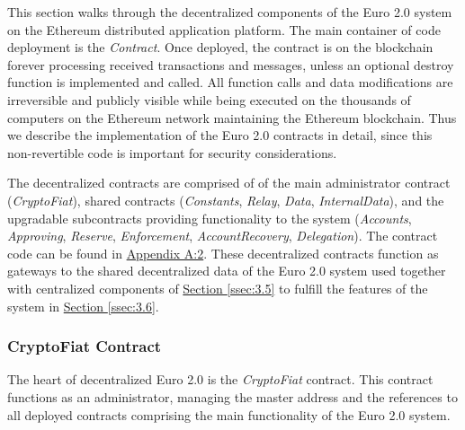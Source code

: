 \documentclass[a4paper,12pt]{article} %
\newcommand{\hypersectionref}[1]{\hyperref[#1]{Section \ref{#1}}}
\begin{document}
{{This section walks through the decentralized components of the Euro 2.0 system on the Ethereum distributed application platform. The main container of code deployment is the \textit{Contract}. Once deployed, the contract is on the blockchain forever processing received transactions and messages, unless an optional destroy function is implemented and called. All function calls and data modifications are irreversible and publicly visible while being executed on the thousands of computers on the Ethereum network maintaining the Ethereum blockchain. Thus we describe the implementation of the Euro 2.0 contracts in detail, since this non-revertible code is important for security considerations.

The decentralized contracts are comprised of of the main administrator contract (\textit{CryptoFiat}), shared contracts (\textit{Constants}, \textit{Relay}, \textit{Data}, \textit{InternalData}), and the upgradable subcontracts providing functionality to the system (\textit{Accounts}, \textit{Approving}, \textit{Reserve}, \textit{Enforcement}, \textit{AccountRecovery}, \textit{Delegation}). The contract code can be found in \hyperref[ssec:a.2]{Appendix A:2}. These decentralized contracts function as gateways to the shared decentralized data of the Euro 2.0 system used together with centralized components of \hypersectionref{ssec:3.5} to fulfill the features of the system in \hypersectionref{ssec:3.6}.


\subsubsection{CryptoFiat Contract} \label{sssec:3.4:cryptofiat}

The heart of decentralized Euro 2.0 is the \textit{CryptoFiat} contract. This contract functions as an administrator, managing the master address and the references to all deployed contracts comprising the main functionality of the Euro 2.0 system.

}}
\end{document}
